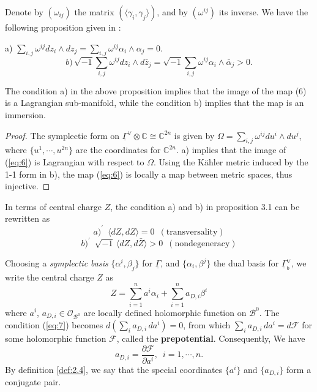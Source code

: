 \documentclass{article}
\begin{document}
Denote by $(\omega_{ij})$ the matrix $(\langle\gamma_{i},\gamma_{j}\rangle)$, and by $(\omega^{ij})$ its inverse. We have the following proposition given in \cite{kontsevich2014wall}:

\begin{proposition}
  a) $\sum_{i,j}\omega^{ij}dz_{i}\wedge dz_{j}=\sum_{i,j}\omega^{ij}\alpha_{i}\wedge\alpha_{j}=0.$
  \[b)\,\sqrt{-1}\sum_{i,j}\omega^{ij}dz_{i}\wedge d\bar{z}_{j}=\sqrt{-1}\sum_{i,j}\omega^{ij}\alpha_{i}\wedge\bar{\alpha}_{j} >0.\]
\end{proposition}

\begin{proposition}
  The condition a) in the above proposition implies that the image of the map (6) is a Lagrangian sub-manifold, while the condition b) implies that the map is an immersion. 
\end{proposition}
\begin{proof}
The symplectic form on $\underline{\Gamma}^{\vee}\otimes\mathbb{C}\cong\mathbb{C}^{2n}$ is given by $\Omega=\sum_{i,j}\omega^{ij}du^{i}\wedge du^{j}$, where $\{u^{1},\cdots,u^{2n}\}$ are the coordinates for $\mathbb{C}^{2n}$. a) implies that the image of (\ref{eq:6}) is Lagrangian with respect to $\Omega$. Using the K\"ahler metric induced by the 1-1 form in b), the map (\ref{eq:6}) is locally a map between metric spaces, thus injective. 
\end{proof}


\begin{remark}
In terms of central charge $Z$, the condition a) and b) in proposition 3.1 can be rewritten as
\begin{equation}\label{eq:7}
a)^{\prime} \,\,\,\langle dZ,dZ\rangle=0\,\,\,(\text{transversality})
\end{equation}
\begin{equation}\label{eq:8}
b)^{\prime}\,\,\, \sqrt{-1}\,\langle dZ,d\bar{Z}\rangle>0\,\,\,(\text{nondegeneracy})
\end{equation}
\end{remark}
Choosing a \textit{symplectic basis} $\{\alpha^{i},\beta_{j}\}$ for $\underline{\Gamma}$, and $\{\alpha_{i},\beta^{j}\}$ the dual basis for $\underline{\Gamma}^{\vee}_{b}$,
we write the central charge $Z$ as
\begin{equation}
Z=\sum_{i=1}^{n}a^{i}\alpha_{i}+\sum_{i=1}^{n}a_{D,i}\beta^{i}
\end{equation}
where $a^{i}$, $a_{D,i}\in\mathscr{O}_{\mathcal{B}^{0}}$ are locally defined holomorphic function on $\mathcal{B}^{0}$. The condition (\ref{eq:7}) becomes $d\left(\sum_{i}a_{D,i}\,da^{i}\right)=0$, from which $\sum_{i}a_{D,i}\,da^{i}=d\mathcal{F}$ for some holomorphic function $\mathcal{F}$, called the \textbf{prepotential}. Consequently, We have
\begin{equation}
a_{D,i}=\frac{\partial\mathcal{F}}{\partial a^{i}},\,\,\,i=1,\cdots,n.
\end{equation}
By definition \ref{def:2.4}, we say that the special coordinates $\{a^{i}\}$ and $\{a_{D,i}\}$ form a conjugate pair.
\end{document}
